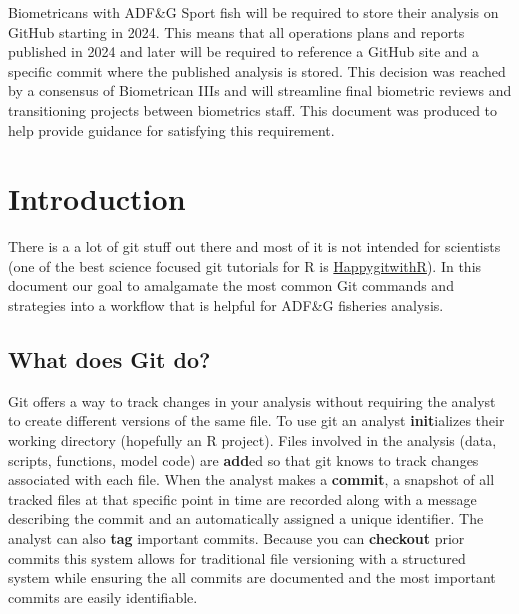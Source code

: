 \documentclass[
  letterpaper,
  DIV=11,
  numbers=noendperiod]{scrreprt}
\begin{document}

Biometricans with ADF\&G Sport fish will be required to store their
analysis on GitHub starting in 2024. This means that all operations
plans and reports published in 2024 and later will be required to
reference a GitHub site and a specific commit where the published
analysis is stored. This decision was reached by a consensus of
Biometrican IIIs and will streamline final biometric reviews and
transitioning projects between biometrics staff. This document was
produced to help provide guidance for satisfying this requirement.


\hypertarget{introduction}{%
\chapter{Introduction}\label{introduction}}

There is a a lot of git stuff out there and most of it is not intended
for scientists (one of the best science focused git tutorials for R is
\href{https://happygitwithr.com/}{HappygitwithR}). In this document our
goal to amalgamate the most common Git commands and strategies into a
workflow that is helpful for ADF\&G fisheries analysis.

\hypertarget{what-does-git-do}{%
\section{What does Git do?}\label{what-does-git-do}}

Git offers a way to track changes in your analysis without requiring the
analyst to create different versions of the same file. To use git an
analyst \textbf{init}ializes their working directory (hopefully an R
project). Files involved in the analysis (data, scripts, functions,
model code) are \textbf{add}ed so that git knows to track changes
associated with each file. When the analyst makes a \textbf{commit}, a
snapshot of all tracked files at that specific point in time are
recorded along with a message describing the commit and an automatically
assigned a unique identifier. The analyst can also \textbf{tag}
important commits. Because you can \textbf{checkout} prior commits this
system allows for traditional file versioning with a structured system
while ensuring the all commits are documented and the most important
commits are easily identifiable.
\end{document}
